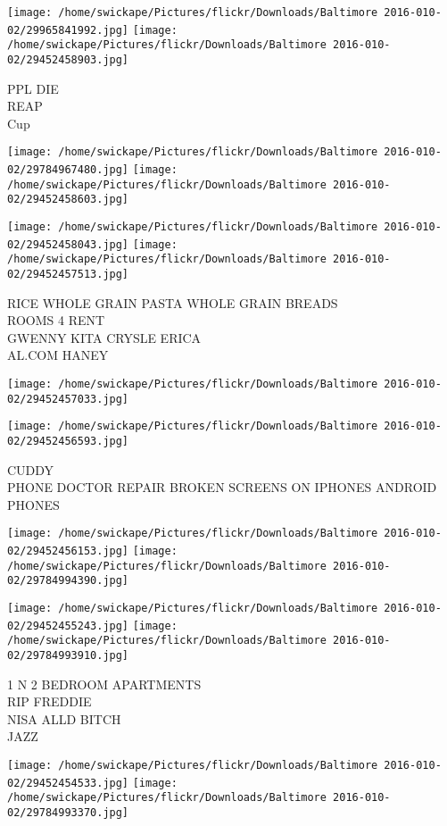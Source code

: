 \documentclass[10pt,letterpaper]{article}
\begin{document}
\vspace{0.25in}
\texttt{[image: /home/swickape/Pictures/flickr/Downloads/Baltimore 2016-010-02/29965841992.jpg]}
\texttt{[image: /home/swickape/Pictures/flickr/Downloads/Baltimore 2016-010-02/29452458903.jpg]}

PPL DIE\\
REAP\\
Cup
\pagebreak

\texttt{[image: /home/swickape/Pictures/flickr/Downloads/Baltimore 2016-010-02/29784967480.jpg]}
\texttt{[image: /home/swickape/Pictures/flickr/Downloads/Baltimore 2016-010-02/29452458603.jpg]}

\texttt{[image: /home/swickape/Pictures/flickr/Downloads/Baltimore 2016-010-02/29452458043.jpg]}
\texttt{[image: /home/swickape/Pictures/flickr/Downloads/Baltimore 2016-010-02/29452457513.jpg]}

RICE WHOLE GRAIN PASTA WHOLE GRAIN BREADS\\
ROOMS 4 RENT\\
GWENNY KITA CRYSLE ERICA\\
AL.COM HANEY
\pagebreak

\texttt{[image: /home/swickape/Pictures/flickr/Downloads/Baltimore 2016-010-02/29452457033.jpg]}

\vspace{0.25in}
\texttt{[image: /home/swickape/Pictures/flickr/Downloads/Baltimore 2016-010-02/29452456593.jpg]}

CUDDY\\
PHONE DOCTOR REPAIR BROKEN SCREENS ON IPHONES ANDROID PHONES
\pagebreak

\texttt{[image: /home/swickape/Pictures/flickr/Downloads/Baltimore 2016-010-02/29452456153.jpg]}
\texttt{[image: /home/swickape/Pictures/flickr/Downloads/Baltimore 2016-010-02/29784994390.jpg]}

\texttt{[image: /home/swickape/Pictures/flickr/Downloads/Baltimore 2016-010-02/29452455243.jpg]}
\texttt{[image: /home/swickape/Pictures/flickr/Downloads/Baltimore 2016-010-02/29784993910.jpg]}

1 N 2 BEDROOM APARTMENTS\\
RIP FREDDIE\\
NISA ALLD BITCH\\
JAZZ
\pagebreak

\texttt{[image: /home/swickape/Pictures/flickr/Downloads/Baltimore 2016-010-02/29452454533.jpg]}
\texttt{[image: /home/swickape/Pictures/flickr/Downloads/Baltimore 2016-010-02/29784993370.jpg]}
\end{document}
